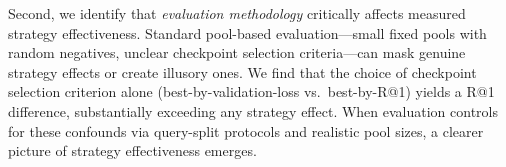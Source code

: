 Second, we identify that \emph{evaluation methodology} critically affects measured strategy effectiveness.
Standard pool-based evaluation---small fixed pools with random negatives, unclear checkpoint selection criteria---can mask genuine strategy effects or create illusory ones.
We find that the choice of checkpoint selection criterion alone (best-by-validation-loss vs.\ best-by-R@1) yields a  R@1 difference, substantially exceeding any strategy effect.
When evaluation controls for these confounds via query-split protocols and realistic pool sizes, a clearer picture of strategy effectiveness emerges.




